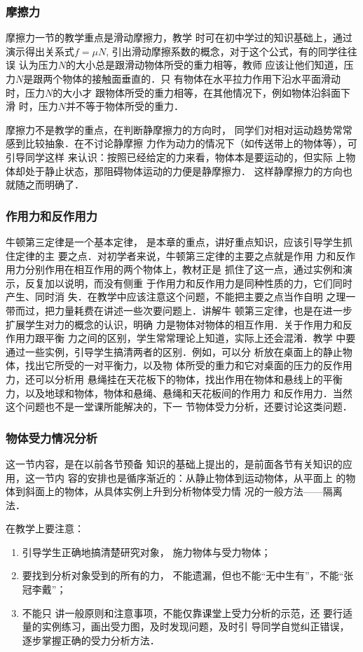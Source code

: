 \subsubsection{摩擦力} 摩擦力一节的教学重点是滑动摩擦力，教学
时可在初中学过的知识基础上，通过演示得出关系式$f=\mu N$,
引出滑动摩擦系数的概念，对于这个公式，有的同学往往误
认为压力$N$的大小总是跟滑动物体所受的重力相等，教师
应该让他们知道，压力$N$是跟两个物体的接触面垂直的．只
有物体在水平拉力作用下沿水平面滑动时，压力$N$的大小才
跟物体所受的重力相等，在其他情况下，例如物体沿斜面下滑
时，压力$N$并不等于物体所受的重力．

摩擦力不是教学的重点，在判断静摩擦力的方向时，
同学们对相对运动趋势常常感到比较抽象．在不讨论静摩擦
力作为动力的情况下（如传送带上的物体等），可引导同学这样
来认识：按照已经给定的力来看，物体本是要运动的，但实际
上物体却处于静止状态，那阻碍物体运动的力便是静摩擦力．
这样静摩擦力的方向也就随之而明确了．

\subsubsection{作用力和反作用力}
牛顿第三定律是一个基本定律，
是本章的重点，讲好重点知识，应该引导学生抓住定律的主
要之点．对初学者来说，牛顿第三定律的主要之点就是作用
力和反作用力分别作用在相互作用的两个物体上，教材正是
抓住了这一点，通过实例和演示，反复加以说明，而没有侧重
于作用力和反作用力是同种性质的力，它们同时产生、同时消
失．在教学中应该注意这个问题，不能把主要之点当作自明
之理一带而过，把力量耗费在讲述一些次要问题上．讲解牛
顿第三定律，也是在进一步扩展学生对力的概念的认识，明确
力是物体对物体的相互作用．关于作用力和反作用力跟平衡
力之间的区别，学生常常理论上知道，实际上还会混淆．教学
中要通过一些实例，引导学生搞清两者的区别．例如，可以分
析放在桌面上的静止物体，找出它所受的一对平衡力，以及物
体所受的重力和它对桌面的压力的反作用力，还可以分析用
悬绳挂在天花板下的物体，找出作用在物体和悬线上的平衡
力，以及地球和物体，物体和悬绳、悬绳和天花板间的作用力
和反作用力．当然这个问题也不是一堂课所能解决的，下一
节物体受力分析，还要讨论这类问题．

\subsubsection{物体受力情况分析}  这一节内容，是在以前各节预备
知识的基础上提出的，是前面各节有关知识的应用，这一节内
容的安排也是循序渐近的：从静止物体到运动物体，从平面上
的物体到斜面上的物体，从具体实例上升到分析物体受力情
况的一般方法——隔离法．

在教学上要注意：
\begin{enumerate}
    \item 引导学生正确地搞清楚研究对象，
施力物体与受力物体；
\item 要找到分析对象受到的所有的力，
不能遗漏，但也不能“无中生有”，不能“张冠李戴”；
\item 不能只
讲一般原则和注意事项，不能仅靠课堂上受力分析的示范，还
要行适量的实例练习，画出受力图，及时发现问题，及时引
导同学自觉纠正错误，逐步掌握正确的受力分析方法．
\end{enumerate}

